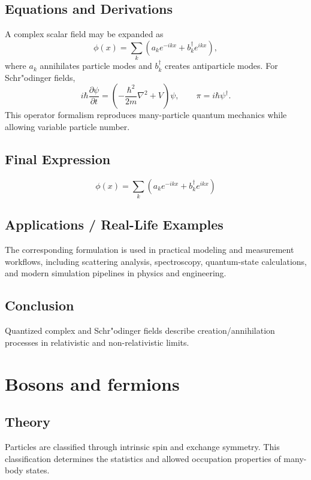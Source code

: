 \documentclass[12pt]{report}
\begin{document}
\subsection*{Equations and Derivations}
A complex scalar field may be expanded as
\begin{equation}
\phi(x)=\sum_k\left(a_k e^{-ikx}+b_k^{\dagger}e^{ikx}\right),
\end{equation}
where $a_k$ annihilates particle modes and $b_k^{\dagger}$ creates antiparticle modes.
For Schr"odinger fields,
\begin{equation}
i\hbar\frac{\partial\psi}{\partial t}=\left(-\frac{\hbar^2}{2m}\nabla^2+V\right)\psi,
\qquad
\pi=i\hbar\psi^{\dagger}.
\end{equation}
This operator formalism reproduces many-particle quantum mechanics while allowing variable particle number.

\subsection*{Final Expression}
\begin{equation}
\boxed{\phi(x)=\sum_k\left(a_k e^{-ikx}+b_k^{\dagger}e^{ikx}\right)}
\end{equation}

\subsection*{Applications / Real-Life Examples}
The corresponding formulation is used in practical modeling and measurement workflows, including scattering analysis, spectroscopy, quantum-state calculations, and modern simulation pipelines in physics and engineering.

\subsection*{Conclusion}
Quantized complex and Schr"odinger fields describe creation/annihilation processes in relativistic and non-relativistic limits.

\section{Bosons and fermions}



\subsection*{Theory}
Particles are classified through intrinsic spin and exchange symmetry. This classification determines the statistics and allowed occupation properties of many-body states.
\end{document}
